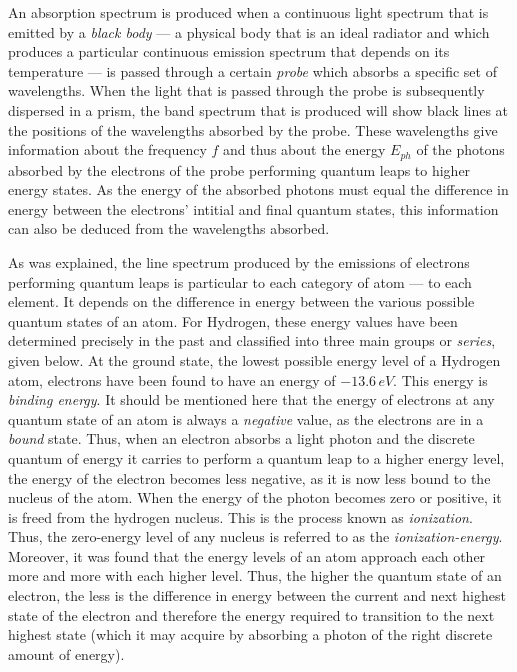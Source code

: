 An absorption spectrum is produced when a continuous light spectrum that is emitted by a \emph{black body} --- a physical body that is an ideal radiator and which produces a particular continuous emission spectrum that depends on its temperature --- is passed through a certain \emph{probe} which absorbs a specific set of wavelengths. When the light that is passed through the probe is subsequently dispersed in a prism, the band spectrum that is produced will show black lines at the positions of the wavelengths absorbed by the probe. These wavelengths give information about the frequency $f$ and thus about the energy $E_{ph}$ of the photons absorbed by the electrons of the probe performing quantum leaps to higher energy states. As the energy of the absorbed photons must equal the difference in energy between the electrons' intitial and final quantum states, this information can also be deduced from the wavelengths absorbed.


As was explained, the line spectrum produced by the emissions of electrons performing quantum leaps is particular to each category of atom --- to each element. It depends on the difference in energy between the various possible quantum states of an atom. For Hydrogen, these energy values have been determined precisely in the past and classified into three main groups or \emph{series}, given below. At the ground state, the lowest possible energy level of a Hydrogen atom, electrons have been found to have an energy of $-13.6\, eV$. This energy is \emph{binding energy}. It should be mentioned here that the energy of electrons at any quantum state of an atom is always a \emph{negative} value, as the electrons are in a \emph{bound} state. Thus, when an electron absorbs a light photon and the discrete quantum of energy it carries to perform a quantum leap to a higher energy level, the energy of the electron becomes less negative, as it is now less bound to the nucleus of the atom. When the energy of the photon becomes zero or positive, it is freed from the hydrogen nucleus. This is the process known as \emph{ionization}. Thus, the zero-energy level of any nucleus is referred to as the \emph{ionization-energy}. Moreover, it was found that the energy levels of an atom approach each other more and more with each higher level. Thus, the higher the quantum state of an electron, the less is the difference in energy between the current and next highest state of the electron and therefore the energy required to transition to the next highest state (which it may acquire by absorbing a photon of the right discrete amount of energy).

